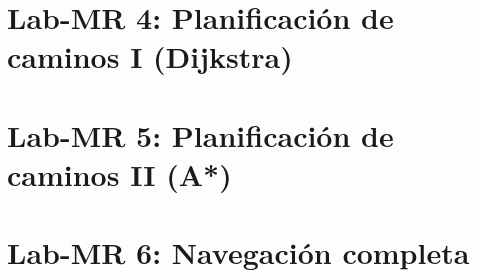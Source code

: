 \documentclass[12pt]{report}
\newcommand{\commonpath}{../../common}
\begin{document}
\chapter{Lab-MR 4: Planificaci\'{o}n de caminos I (Dijkstra)}
\graphicspath{{../lab4_dijkstra/figures/}{\commonpath/img/}}


\clearpage


\chapter{Lab-MR 5: Planificaci\'{o}n de caminos II (A*)}
\graphicspath{{../lab5_a_estrella/figures/}{\commonpath/img/}}


\clearpage


\chapter{Lab-MR 6: Navegaci\'{o}n completa}
\graphicspath{{../lab6_navegacion_completa/figures/}{\commonpath/img/}}

\end{document}
